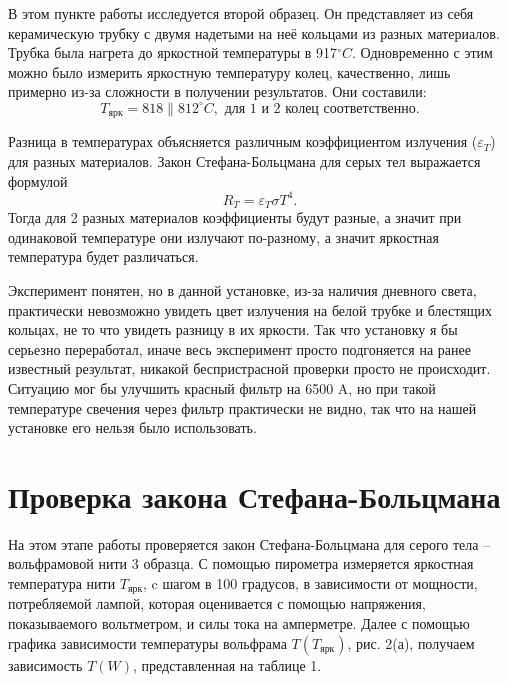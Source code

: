 \documentclass[a4paper, 14pt]{extarticle}%
\begin{document}
В этом пункте работы исследуется второй образец. Он представляет из себя керамическую трубку с двумя надетыми на неё кольцами из разных материалов. Трубка была нагрета до яркостной температуры в 917$^{\circ} C$. Одновременно с этим можно было измерить яркостную температуру колец, качественно, лишь примерно из-за сложности в получении результатов. Они составили:
\[T_{\text{ярк}} = 818\parallel 812^{\circ}C, \text{ для 1 и 2 колец соответственно.}\]

Разница в температурах объясняется различным коэффициентом излучения ($\varepsilon_T$) для разных материалов. Закон Стефана-Больцмана для серых тел выражается формулой
\begin{equation}
R_T = \varepsilon_T \sigma T^4.
\end{equation}
Тогда для 2 разных материалов коэффициенты будут разные, а значит при одинаковой температуре они излучают по-разному, а значит яркостная температура будет различаться.

Эксперимент понятен, но в данной установке, из-за наличия дневного света, практически невозможно увидеть цвет излучения на белой трубке и блестящих кольцах, не то что увидеть разницу в их яркости. Так что установку я бы серьезно переработал, иначе весь эксперимент просто подгоняется на ранее известный результат, никакой беспристрасной проверки просто не происходит. Ситуацию мог бы улучшить красный фильтр на 6500 A, но при такой температуре свечения через фильтр практически не видно, так что на нашей установке его нельзя было использовать.

\section*{Проверка закона Стефана-Больцмана}

На этом этапе работы проверяется закон Стефана-Больцмана для серого тела -- вольфрамовой нити 3 образца.  С помощью пирометра измеряется яркостная температура нити $T_{\text{ярк}}$, c шагом в 100 градусов, в зависимости от мощности, потребляемой лампой, которая оценивается с помощью напряжения, показываемого вольтметром, и силы тока на амперметре. Далее с помощью графика зависимости температуры вольфрама $T(T_{\text{ярк}})$, рис. 2(а), получаем зависимость $T(W)$, представленная на таблице 1.
\end{document}
